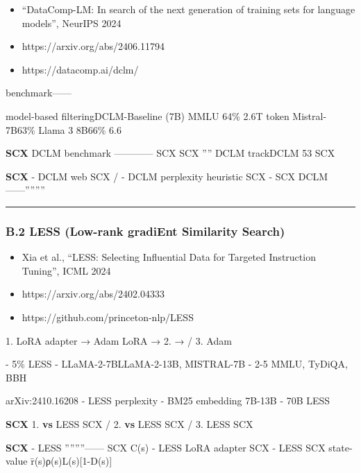 \documentclass[
  12pt,
]{article}
\providecommand{\tightlist}{%
  \setlength{\itemsep}{0pt}\setlength{\parskip}{0pt}}
\begin{document}
\begin{itemize}
\tightlist
\item
  \textbf{}``DataComp-LM: In search of the next generation of
  training sets for language models'', NeurIPS 2024
\item
  \textbf{}https://arxiv.org/abs/2406.11794
\item
  \textbf{}https://datacomp.ai/dclm/
\end{itemize}

\textbf{}
benchmark------

\textbf{}model-based
filteringDCLM-Baseline (7B)  MMLU 
64\% 2.6T token  Mistral-7B63\% Llama 3
8B66\% 6.6 

\textbf{ SCX }DCLM  benchmark
------\textbf{}------
SCX SCX '''' DCLM 
trackDCLM  53  SCX


\textbf{SCX } - DCLM  web
SCX / -
DCLM perplexity heuristic \textbf{}SCX
\textbf{} - SCX 
DCLM
------''''''''

\begin{center}\rule{0.5\linewidth}{0.5pt}\end{center}

\subsubsection{B.2 LESS (Low-rank gradiEnt Similarity
Search)}\label{b.2-less-low-rank-gradient-similarity-search}

\begin{itemize}
\tightlist
\item
  \textbf{}Xia et al., ``LESS: Selecting Influential Data for
  Targeted Instruction Tuning'', ICML 2024
\item
  \textbf{}https://arxiv.org/abs/2402.04333
\item
  \textbf{}https://github.com/princeton-nlp/LESS
\end{itemize}

\textbf{}

\textbf{} 1.  LoRA adapter →  Adam LoRA
 →  2.  →
/ 3.  Adam


\textbf{} - 5\%  LESS  -
LLaMA-2-7BLLaMA-2-13B, MISTRAL-7B -
 2-5 MMLU, TyDiQA, BBH

\textbf{}arXiv:2410.16208 -
LESS  perplexity  -
BM25  embedding  7B-13B  -
70B LESS 

\textbf{ SCX } 1. \textbf{ vs }LESS
SCX
/
2. \textbf{ vs }LESS
SCX
/ 3. \textbf{}LESS
SCX 

\textbf{SCX } - LESS
''''''''------
SCX  C(s)  - LESS  LoRA adapter
SCX
 - LESS
SCX  state-value
 r̄(s)ρ(s)L(s){[}1-D(s){]}
\end{document}
